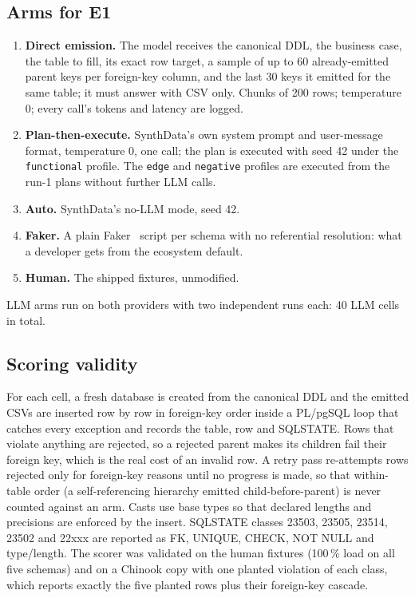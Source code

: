 \documentclass[preprint,12pt]{elsarticle}
\begin{document}
\subsection{Arms for E1}
\begin{enumerate}
\item \textbf{Direct emission.} The model receives the canonical DDL, the business case, the table to fill, its exact row target, a sample of up to 60 already-emitted parent keys per foreign-key column, and the last 30 keys it emitted for the same table; it must answer with CSV only. Chunks of 200 rows; temperature 0; every call's tokens and latency are logged.
\item \textbf{Plan-then-execute.} SynthData's own system prompt and user-message format, temperature 0, one call; the plan is executed with seed 42 under the \texttt{functional} profile. The \texttt{edge} and \texttt{negative} profiles are executed from the run-1 plans without further LLM calls.
\item \textbf{Auto.} SynthData's no-LLM mode, seed 42.
\item \textbf{Faker.} A plain Faker~\cite{faker} script per schema with no referential resolution: what a developer gets from the ecosystem default.
\item \textbf{Human.} The shipped fixtures, unmodified.
\end{enumerate}
LLM arms run on both providers with two independent runs each: 40 LLM cells in total.

\subsection{Scoring validity}
\label{sec:scorer}
For each cell, a fresh database is created from the canonical DDL and the emitted CSVs are inserted row by row in foreign-key order inside a PL/pgSQL loop that catches every exception and records the table, row and SQLSTATE. Rows that violate anything are rejected, so a rejected parent makes its children fail their foreign key, which is the real cost of an invalid row. A retry pass re-attempts rows rejected only for foreign-key reasons until no progress is made, so that within-table order (a self-referencing hierarchy emitted child-before-parent) is never counted against an arm. Casts use base types so that declared lengths and precisions are enforced by the insert. SQLSTATE classes 23503, 23505, 23514, 23502 and 22xxx are reported as FK, UNIQUE, CHECK, NOT NULL and type/length. The scorer was validated on the human fixtures (100\,\% load on all five schemas) and on a Chinook copy with one planted violation of each class, which reports exactly the five planted rows plus their foreign-key cascade.
\end{document}
